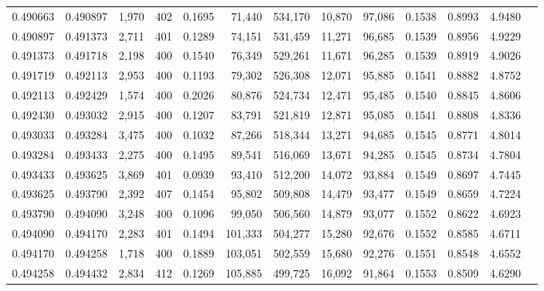 \begin{tabular}{rrrrrrrrrrrrr}
0.490663 & 0.490897 & 1,970 & 402 &                                     0.1695 &  71,440 & 534,170 &  10,870 &  97,086 & 0.1538 & 0.8993 & 4.9480 \\
0.490897 & 0.491373 & 2,711 & 401 &                                     0.1289 &  74,151 & 531,459 &  11,271 &  96,685 & 0.1539 & 0.8956 & 4.9229 \\
0.491373 & 0.491718 & 2,198 & 400 &                                     0.1540 &  76,349 & 529,261 &  11,671 &  96,285 & 0.1539 & 0.8919 & 4.9026 \\
0.491719 & 0.492113 & 2,953 & 400 &                                     0.1193 &  79,302 & 526,308 &  12,071 &  95,885 & 0.1541 & 0.8882 & 4.8752 \\
0.492113 & 0.492429 & 1,574 & 400 &                                     0.2026 &  80,876 & 524,734 &  12,471 &  95,485 & 0.1540 & 0.8845 & 4.8606 \\
0.492430 & 0.493032 & 2,915 & 400 &                                     0.1207 &  83,791 & 521,819 &  12,871 &  95,085 & 0.1541 & 0.8808 & 4.8336 \\
0.493033 & 0.493284 & 3,475 & 400 &                                     0.1032 &  87,266 & 518,344 &  13,271 &  94,685 & 0.1545 & 0.8771 & 4.8014 \\
0.493284 & 0.493433 & 2,275 & 400 &                                     0.1495 &  89,541 & 516,069 &  13,671 &  94,285 & 0.1545 & 0.8734 & 4.7804 \\
0.493433 & 0.493625 & 3,869 & 401 &                                     0.0939 &  93,410 & 512,200 &  14,072 &  93,884 & 0.1549 & 0.8697 & 4.7445 \\
0.493625 & 0.493790 & 2,392 & 407 &                                     0.1454 &  95,802 & 509,808 &  14,479 &  93,477 & 0.1549 & 0.8659 & 4.7224 \\
0.493790 & 0.494090 & 3,248 & 400 &                                     0.1096 &  99,050 & 506,560 &  14,879 &  93,077 & 0.1552 & 0.8622 & 4.6923 \\
0.494090 & 0.494170 & 2,283 & 401 &                                     0.1494 & 101,333 & 504,277 &  15,280 &  92,676 & 0.1552 & 0.8585 & 4.6711 \\
0.494170 & 0.494258 & 1,718 & 400 &                                     0.1889 & 103,051 & 502,559 &  15,680 &  92,276 & 0.1551 & 0.8548 & 4.6552 \\
0.494258 & 0.494432 & 2,834 & 412 &                                     0.1269 & 105,885 & 499,725 &  16,092 &  91,864 & 0.1553 & 0.8509 & 4.6290 \\

\end{tabular}
